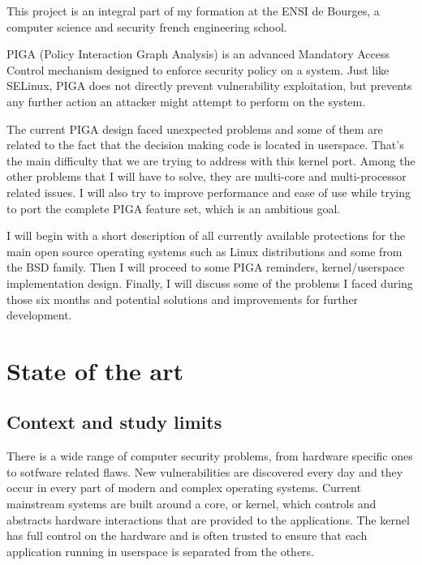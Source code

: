 \documentclass[pdftex,a4paper,titlepage,11pt]{article}
\begin{document}
This project is an integral part of my formation at the ENSI de Bourges, a
computer science and security french engineering school.

\bigskip

PIGA (Policy Interaction Graph Analysis) is an advanced Mandatory Access Control
mechanism designed to enforce security policy on a system. Just like SELinux,
PIGA does not directly prevent vulnerability exploitation, but prevents any
further action an attacker might attempt to perform on the system.

\bigskip

The current PIGA design faced unexpected problems and some of them are related
to the fact that the decision making code is located in userspace. That's the
main difficulty that we are trying to address with this kernel port. Among the
other problems that I will have to solve, they are multi-core and
multi-processor related issues. I will also try to improve performance and ease
of use while trying to port the complete PIGA feature set, which is an
ambitious goal.

\bigskip

I will begin with a short description of all currently available protections for
the main open source operating systems such as Linux distributions and some from
the BSD family. Then I will proceed to some PIGA reminders, kernel/userspace
implementation design. Finally, I will discuss some of the problems I faced
during those six months and potential solutions and improvements for further
development.


\newpage

\section{State of the art}

\subsection{Context and study limits}


There is a wide range of computer security problems, from hardware specific ones
to sotfware related flaws. New vulnerabilities are discovered every day and they
occur in every part of modern and complex operating systems. Current mainstream
systems are built around a core, or kernel, which controls and abstracts
hardware interactions that are provided to the applications. The kernel has full
control on the hardware and is often trusted to ensure that each application
running in userspace is separated from the others.
\end{document}
